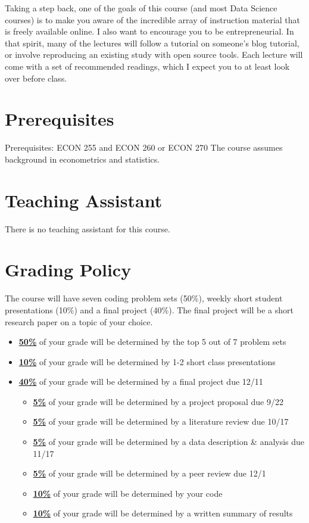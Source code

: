 \documentclass[11pt]{article}
\begin{document}
Taking a step back, one of the goals of this course (and most Data Science courses) is to make you aware of the incredible array of instruction material that is freely available online. I also want to encourage you to be entrepreneurial. In that spirit, many of the lectures will follow a tutorial on someone's blog tutorial, or involve reproducing an existing study with open source tools. Each lecture will come with a set of recommended readings, which I expect you to at least look over before class.

\section*{Prerequisites}
Prerequisites: ECON 255 and ECON 260 or ECON 270 The course assumes background in econometrics and statistics. 

\section*{Teaching Assistant}

There is no teaching assistant for this course. 

\section*{Grading Policy}
The course will have seven coding problem sets (50\%), weekly short student presentations (10\%) and a final project (40\%). The final project will be a short research paper on a topic of your choice. 

\begin{itemize}
	\item \underline{\textbf{50\%}} of your grade will be determined by the top 5 out of 7 problem sets
	\item \underline{\textbf{10\%}} of your grade will be determined by 1-2 short class presentations
	\item \underline{\textbf{40\%}} of your grade will be determined by a final project due 12/11
	\begin{itemize}
    \item \underline{\textbf{5\%}} of your grade will be determined by a project proposal due 9/22
    \item \underline{\textbf{5\%}} of your grade will be determined by a literature review due 10/17
    \item \underline{\textbf{5\%}} of your grade will be determined by a data description \& analysis due 11/17
    \item \underline{\textbf{5\%}} of your grade will be determined by a peer review due 12/1
    \item \underline{\textbf{10\%}} of your grade will be determined by your code
    \item \underline{\textbf{10\%}} of your grade will be determined by a written summary of results
  \end{itemize}
\end{itemize}
\end{document}
